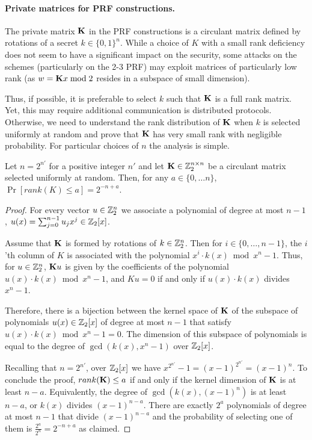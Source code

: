 \paragraph{Private matrices for PRF constructions.}
The private matrix $\mat{K}$ in the PRF constructions is a circulant matrix
defined by rotations of a secret $k \in \{0,1\}^n$.
While a choice of $K$ with a small rank deficiency does not seem to
have a significant impact on the security,
some attacks on the schemes (particularly on the 2-3 PRF) may exploit
matrices of particularly low rank
(as $w = \mat{K}x \bmod 2$ resides in a subspace of small dimension).

Thus, if possible, it is preferable to select $k$ such that $\mat{K}$
is a full rank matrix. Yet, this may require additional communication
is distributed protocols.
Otherwise, we need to understand the rank distribution of $\mat{K}$
when $k$ is selected uniformly at random and prove that $\mat{K}$
has very small rank with negligible probability.
For particular choices of $n$ the analysis is simple.
\begin{proposition}
\label{prop:rank}
Let $n = 2^{n'}$ for a positive integer $n'$
and let $\mat{K} \in \Z_2^{n \times n}$
be a circulant matrix selected uniformly at random.
Then, for any $a \in \{0,\ldots n\}$,
$\Pr[rank(K) \leq a] = 2^{-n+a}$.
\end{proposition}

\begin{proof}
For every vector $u \in \mathbb{Z}_2^{n}$
we associate a polynomial of degree at most $n-1$,
$u(x) = \sum_{j=0}^{n-1} u_j x^{j} \in \mathbb{Z}_2[x]$.

Assume that $\mat{K}$ is formed by rotations
of $k \in \mathbb{Z}_2^{n}$.
Then for $i \in \{0,\ldots, n-1\}$,
the $i$'th column of $K$ is associated with the polynomial
$x^i \cdot k(x) \bmod x^n - 1$.
Thus, for $u \in \mathbb{Z}_2^{n}$, $\mat{K}u$ is given
by the coefficients of the polynomial
$u(x) \cdot k(x) \bmod x^n - 1$,
and $Ku = 0$ if and only if
$u(x) \cdot k(x)$ divides $x^n - 1$.

Therefore, there is a bijection between the kernel space of $\mat{K}$
of the subspace of polynomials $u(x) \in \mathbb{Z}_2[x]$
of degree at most $n-1$
that satisfy $u(x) \cdot k(x) \bmod x^n - 1 = 0$.
The dimension of this subspace of polynomials is equal to
the degree of $\gcd(k(x), x^n - 1)$ over $\mathbb{Z}_2[x]$.

Recalling that $n = 2^{n'}$, over $\mathbb{Z}_2[x]$ we have
$x^{2^{n'}} - 1 = (x - 1)^{2^{n'}} = (x - 1)^n$.
To conclude the proof,
$rank(\mat{K}) \leq a$ if and only if
the kernel dimension of $\mat{K}$ is at least $n-a$.
Equivalently, the degree of $\gcd(k(x), (x - 1)^n)$
is at least $n-a$, or
$k(x)$ divides $(x - 1)^{n-a}$.
There are exactly $2^a$ polynomials of degree at most
$n-1$ that divide $(x - 1)^{n-a}$
and the probability of selecting one of them is
$\tfrac{2^{a}}{2^n} = 2^{-n+a}$ as claimed.
\end{proof}





